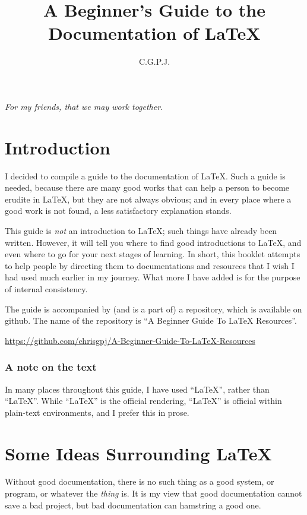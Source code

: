 \documentclass[11pt, oneside]{memoir}
\title{A Beginner's Guide to the Documentation of \LaTeX{}}
\author{C.\thinspace G.\thinspace P.\thinspace J.\thinspace}
\begin{document}
\maketitle
\thispagestyle{empty}

\RaggedRight
\newpage
\thispagestyle{empty}
\emph{For my friends, that we may work together}.

\newpage
\tableofcontents

\chapter{Introduction}
I decided to compile a guide to the documentation of \LaTeX{}. Such a guide is needed, because there are many good works that can help a person to become erudite in \LaTeX{}, but they are not always obvious; and in every place where a good work is not found, a less satisfactory explanation stands.

This guide is \emph{not} an introduction to LaTeX; such things have already been written. However, it will tell you where to find good introductions to LaTeX, and even where to go for your next stages of learning. In short, this booklet attempts to help people by directing them to documentations and resources that I wish I had used much earlier in my journey. What more I have added is for the purpose of internal consistency.

The guide is accompanied by (and is a part of) a repository, which is available on github. The name of the repository is ``A Beginner Guide To LaTeX Resources''.

\url{https://github.com/chrisgpj/A-Beginner-Guide-To-LaTeX-Resources}

\subsection{A note on the text}
In many places throughout this guide, I have used ``LaTeX'', rather than ``\LaTeX{}''. While ``\LaTeX{}'' is the official rendering, ``LaTeX'' is official within plain-text environments, and I prefer this in prose.

\chapter{Some Ideas Surrounding \LaTeX{}}
Without good documentation, there is no such thing as a good system, or program, or whatever the \emph{thing} is. It is my view that good documentation cannot save a bad project, but bad documentation can hamstring a good one.
\end{document}
